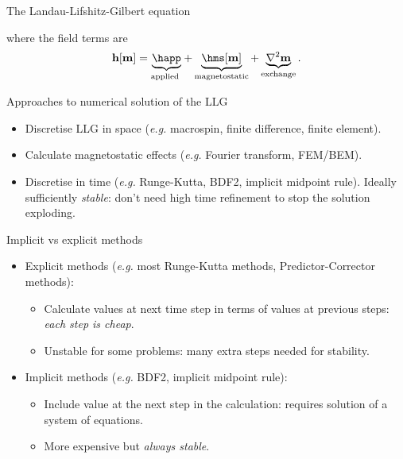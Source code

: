 \documentclass[final]{beamer} %
\newlength{\wideitemsep}
\let\olditem\item
\renewcommand{\item}{\setlength{\itemsep}{\wideitemsep}\olditem}
\newcommand{\mv}{\mathbf{m}}
\newcommand{\hv}{\mathbf{h}}
\newcommand{\eg}{\textit{e.g.} }
\begin{document}
\begin{frame}
\begin{columns}
\begin{column}{0.47\textwidth}
{\begin{block}{\boxnumber The Landau-Lifshitz-Gilbert equation}
\begin{itemize}
            where the field terms are
            \begin{equation}
              \hv[\mv] = \underbrace{\happ}_{\text{applied }}
              + \underbrace{\hms[\mv]}_{\text{magnetostatic}}
              + \underbrace{\nabla^2 \mv}_{\text{exchange}}.
            \end{equation}
          \end{itemize}
        \end{block}

        \vfill

        \begin{block}{\boxnumber Approaches to numerical solution of the LLG}
          \begin{itemize}
          \item Discretise LLG in space (\eg macrospin, finite difference, finite element).
          \item Calculate magnetostatic effects (\eg Fourier transform, FEM/BEM).
          \item Discretise in time (\eg Runge-Kutta, BDF2, implicit midpoint rule). Ideally
            sufficiently \emph{stable}: don't need high time refinement to stop the solution exploding.
          \end{itemize}
        \end{block}

        \vfill

        \begin{block}{\boxnumber Implicit vs explicit methods} 
          \begin{itemize} 
          \item Explicit methods (\eg most Runge-Kutta methods, Predictor-Corrector methods):
            \begin{itemize}
            \item Calculate values at next time step in terms of values at previous steps: \emph{each step is cheap}.
            \item Unstable for some problems: many extra steps needed for stability.
            \end{itemize}

          \item Implicit methods (\eg BDF2, implicit midpoint rule):
            \begin{itemize}
            \item Include value at the next step in the calculation: requires solution of a system of equations. 
            \item More expensive but \emph{always stable}.
            \end{itemize}


\end{itemize}
\end{block}}
\end{column}
\end{columns}
\end{frame}
\end{document}
